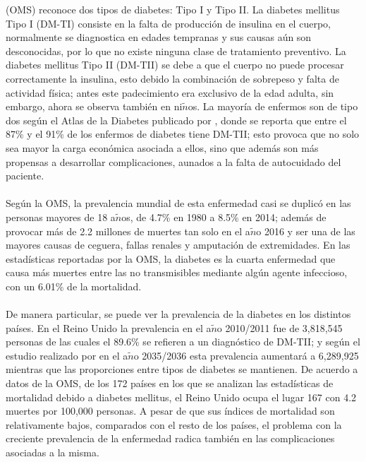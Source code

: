  (OMS) reconoce dos tipos de diabetes: Tipo I y Tipo II. La diabetes mellitus Tipo I (DM-TI) consiste en la falta de producci\'on de insulina en el cuerpo, normalmente se diagnostica en edades tempranas y sus causas a\'un son desconocidas, por lo que no existe ninguna clase de tratamiento preventivo. La diabetes mellitus Tipo II (DM-TII) se debe a que el cuerpo no puede procesar correctamente la insulina, esto debido la combinaci\'on de sobrepeso y falta de actividad f\'isica; antes este padecimiento era exclusivo de la edad adulta, sin embargo, ahora se observa tambi\'en en ni$\tilde{n}$os. La mayor\'ia de enfermos son de tipo dos seg\'un el Atlas de la Diabetes publicado por \cite{atlas2015international}, donde se reporta que entre el 87\% y el 91\% de los enfermos de diabetes tiene DM-TII; esto provoca que no solo sea mayor la carga econ\'omica asociada a ellos, sino que adem\'as son m\'as propensas a desarrollar complicaciones, aunados a la falta de autocuidado del paciente.\\
\\
Seg\'un la OMS, la prevalencia mundial de esta enfermedad casi se duplic\'o en las personas mayores de 18 a$\tilde{n}$os, de 4.7\% en 1980 a 8.5\% en 2014; adem\'as de provocar m\'as de 2.2 millones de muertes tan solo en el a$\tilde{n}$o 2016 y ser una de las mayores causas de ceguera, fallas renales y amputaci\'on de extremidades. En las estad\'isticas reportadas por la OMS, la diabetes es la cuarta enfermedad que causa m\'as muertes entre las no transmisibles mediante alg\'un agente infeccioso, con un 6.01\% de la mortalidad.\\
\\
De manera particular, se puede ver la prevalencia de la diabetes en los distintos pa\'ises. En el Reino Unido la prevalencia en el a$\tilde{n}$o 2010/2011 fue de 3,818,545 personas de las cuales el 89.6\% se refieren a un diagn\'ostico de DM-TII; y seg\'un el estudio realizado por \cite{hex2012estimating} en el a$\tilde{n}$o 2035/2036 esta prevalencia aumentar\'a a 6,289,925 mientras que las proporciones entre tipos de diabetes se mantienen. De acuerdo a datos de la OMS, de los 172 pa\'ises en los que se analizan las estad\'isticas de mortalidad debido a diabetes mellitus, el Reino Unido ocupa el lugar 167 con 4.2 muertes por 100,000 personas. A pesar de que sus \'indices de mortalidad son relativamente bajos, comparados con el resto de los pa\'ises, el problema con la creciente prevalencia de la enfermedad radica tambi\'en en las complicaciones asociadas a la misma.\\
